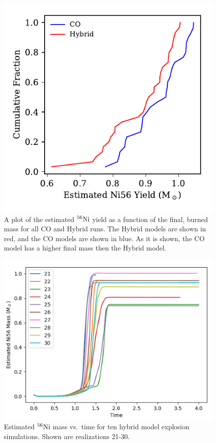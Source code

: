 \documentclass[iop,apj]{emulateapj}
\newcommand{\Ni}[1]{\ensuremath{{}^{#1}{\rm Ni}}}
\begin{document}
\begin{figure}
\includegraphics[width=\columnwidth]{figures/ni56_yield_cum_dist.pdf}
\caption{\label{fig:cumdist}
A plot of the estimated \Ni{56} yield as a function of the final, burned mass
for all CO and Hybrid runs. The Hybrid models are shown in red, and the CO
models are shown in blue. As it is shown, the CO model has a higher final mass
then the Hybrid model. 
}
\end{figure}

\begin{figure}
\includegraphics[width=\columnwidth]{figures/ni56_vs_time_hybrid.png}
\caption{\label{fig:nithybrid}
Estimated \Ni{56} mass vs.\ time for ten hybrid model explosion simulations. 
Shown are realizations 21-30. 
}
\end{figure}
\end{document}
